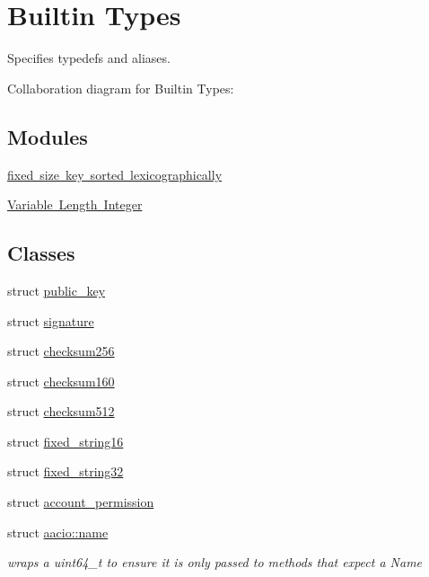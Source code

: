 \hypertarget{group__types}{}\section{Builtin Types}
\label{group__types}


Specifies typedefs and aliases.  


Collaboration diagram for Builtin Types\+:
\subsection*{Modules}
\begin{DoxyCompactItemize}
\item 
\mbox{\hyperlink{group__fixed__key}{fixed size key sorted lexicographically}}
\item 
\mbox{\hyperlink{group__varint}{Variable Length Integer}}
\end{DoxyCompactItemize}
\subsection*{Classes}
\begin{DoxyCompactItemize}
\item 
struct \mbox{\hyperlink{structpublic__key}{public\+\_\+key}}
\item 
struct \mbox{\hyperlink{structsignature}{signature}}
\item 
struct \mbox{\hyperlink{structchecksum256}{checksum256}}
\item 
struct \mbox{\hyperlink{structchecksum160}{checksum160}}
\item 
struct \mbox{\hyperlink{structchecksum512}{checksum512}}
\item 
struct \mbox{\hyperlink{structfixed__string16}{fixed\+\_\+string16}}
\item 
struct \mbox{\hyperlink{structfixed__string32}{fixed\+\_\+string32}}
\item 
struct \mbox{\hyperlink{structaccount__permission}{account\+\_\+permission}}
\item 
struct \mbox{\hyperlink{structaacio_1_1name}{aacio\+::name}}
\begin{DoxyCompactList}\small\item\em wraps a uint64\+\_\+t to ensure it is only passed to methods that expect a Name \end{DoxyCompactList}\end{DoxyCompactItemize}
